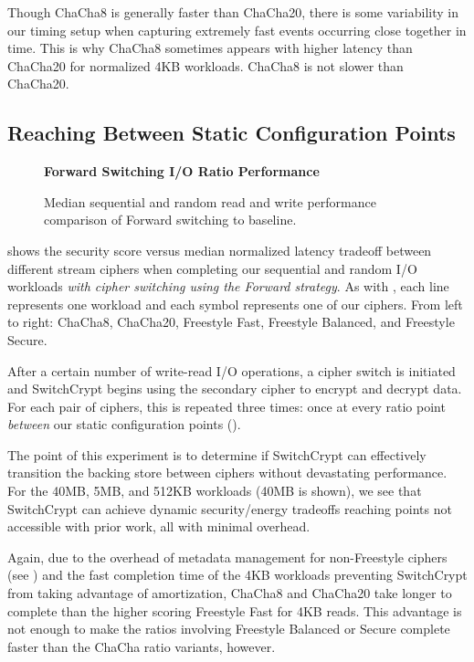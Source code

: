 Though ChaCha8 is generally faster than ChaCha20, there is some variability in
our timing setup when capturing extremely fast events occurring close together
in time. This is why ChaCha8 sometimes appears with higher latency than
ChaCha20 for normalized 4KB workloads. ChaCha8 is not slower than ChaCha20.

\subsection{Reaching Between Static Configuration Points} \label{subsec:2}

\begin{figure}[ht]
  \textbf{Forward Switching I/O Ratio Performance}\par\medskip
  {} \caption{Median sequential and
  random read and write performance comparison of Forward switching to
  baseline.}
 \label{fig:tradeoff-with-ratios}
\end{figure}

 shows the security score versus median normalized
latency tradeoff between different stream ciphers when completing our sequential
and random I/O workloads \emph{with cipher switching using the Forward
strategy}. As with , each line represents one
workload and each symbol represents one of our ciphers. From left to right:
ChaCha8, ChaCha20, Freestyle Fast, Freestyle Balanced, and Freestyle Secure.

After a certain number of write-read I/O operations, a cipher switch is
initiated and SwitchCrypt begins using the secondary cipher to encrypt and
decrypt data. For each pair of ciphers, this is repeated three times: once at
every ratio point \emph{between} our static configuration points ().

The point of this experiment is to determine if SwitchCrypt can effectively
transition the backing store between ciphers without devastating performance.
For the 40MB, 5MB, and 512KB workloads (40MB is shown), we see that SwitchCrypt
can achieve dynamic security/energy tradeoffs reaching points not accessible
with prior work, all with minimal overhead.

Again, due to the overhead of metadata management for non-Freestyle ciphers (see
) and the fast completion time of the 4KB workloads
preventing SwitchCrypt from taking advantage of amortization, ChaCha8 and
ChaCha20 take longer to complete than the higher scoring Freestyle Fast for 4KB
reads. This advantage is not enough to make the ratios involving Freestyle
Balanced or Secure complete faster than the ChaCha ratio variants, however.

